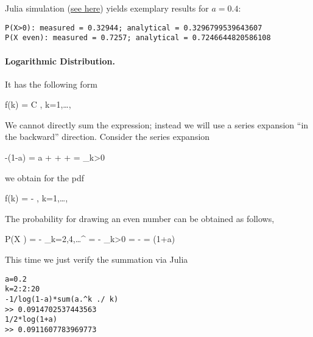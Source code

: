 Julia simulation (\href{https://github.com/ClemensFMN/JuliaStuff/blob/master/stochastic/poisson_rv.jl}{see here}) yields exemplary results for $a=0.4$:

\begin{verbatim}
P(X>0): measured = 0.32944; analytical = 0.3296799539643607
P(X even): measured = 0.7257; analytical = 0.7246644820586108
\end{verbatim}


\paragraph{Logarithmic Distribution.} It has the following form

\bee
f(k) = C , \quad k=1,\ldots,\infty
\eee

We cannot directly sum the expression; instead we will use a series expansion ``in the backward'' direction. Consider the series expansion

\bee
-\ln(1-a) = a +  +  + \cdots = \sum_{k>0} 
\eee

we obtain for the pdf

\bee
f(k) = - , \quad k=1,\ldots,\infty
\eee

The probability for drawing an even number can be obtained as follows,

\bee
P(X ) = - \sum_{k=2,4,\ldots}^\infty {} = - \sum_{k>0}  = - =  \ln(1+a)
\eee

This time we just verify the summation via Julia

\begin{verbatim}
a=0.2
k=2:2:20
-1/log(1-a)*sum(a.^k ./ k)
>> 0.0914702537443563
1/2*log(1+a)
>> 0.0911607783969773
\end{verbatim}

